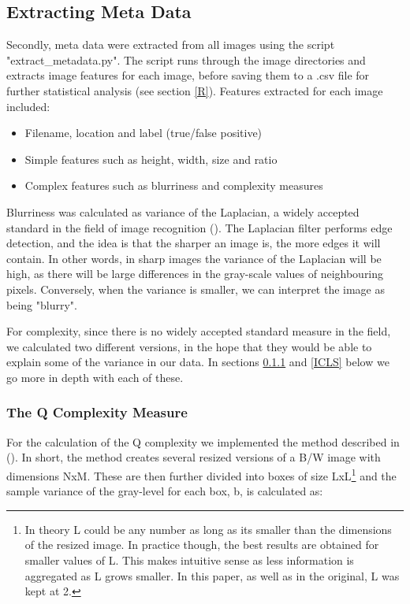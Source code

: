 \documentclass[12pt]{article}
\begin{document}
\subsection{Extracting Meta Data}
Secondly, meta data were extracted from all images using the script "extract\_metadata.py". The script runs through the image directories and extracts image features for each image, before saving them to a .csv file for further statistical  analysis (see section \ref{R}).
Features extracted for each image included:

\begin{itemize}
	\item Filename, location and label (true/false positive)
	\item Simple features such as height, width, size and ratio
	\item Complex features such as blurriness and complexity measures
\end{itemize}

Blurriness was calculated as variance of the Laplacian, a widely accepted standard in the field of image recognition (\cite{bansalBlurImageDetection2016}). The Laplacian filter performs edge detection, and the idea is that the sharper an image is, the more edges it will contain. In other words, in sharp images the variance of the Laplacian will be high, as there will be large differences in the gray-scale values of neighbouring pixels. Conversely, when the variance is smaller, we can interpret the image as being "blurry".

For complexity, since there is no widely accepted standard measure in the field, we calculated two different versions, in the hope that they would be able to explain some of the variance in our data. In sections \ref{Q} and \ref{ICLS} below we go more in depth with each of these.

\subsubsection{The Q Complexity Measure}\label{Q}
For the calculation of the Q complexity we implemented the method described in (\cite{zanetteQuantifyingComplexityBlackandwhite2018}). In short, the method creates several resized versions of a B/W image with dimensions NxM. These are then further divided into boxes of size LxL\footnote{In theory L could be any number as long as its smaller than the dimensions of the resized image. In practice though, the best results are obtained for smaller values of L. This makes intuitive sense as less information is aggregated as L grows smaller. In this paper, as well as in the original, L was kept at 2.} and the sample variance of the gray-level for each box, b, is calculated as: 
\end{document}
